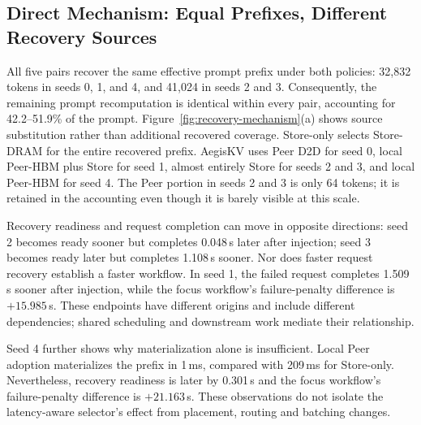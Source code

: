 \subsection{Direct Mechanism: Equal Prefixes, Different Recovery Sources}
\label{sec:direct-results}


All five pairs recover the same effective prompt prefix under both policies:
32,832 tokens in seeds 0, 1, and 4, and 41,024 in seeds 2 and 3.
Consequently, the remaining prompt recomputation is identical within every
pair, accounting for 42.2--51.9\% of the prompt.
Figure~\ref{fig:recovery-mechanism}(a) shows source substitution rather
than additional recovered coverage. Store-only selects Store-DRAM for the
entire recovered prefix. AegisKV uses Peer D2D for seed 0, local Peer-HBM
plus Store for seed 1, almost entirely Store for seeds 2 and 3, and local
Peer-HBM for seed 4. The Peer portion in seeds 2 and 3 is only 64 tokens;
it is retained in the accounting even though it is barely visible at this scale.

Recovery readiness and request completion can move in opposite directions:
seed 2 becomes ready sooner but completes 0.048\,s later after injection;
seed 3 becomes ready later but completes 1.108\,s sooner.
Nor does faster request recovery establish a faster workflow. In seed 1,
the failed request completes 1.509\,s sooner after injection, while the
focus workflow's failure-penalty difference is $+15.985$\,s.
These endpoints have different origins and include different dependencies;
shared scheduling and downstream work mediate their relationship.

Seed 4 further shows why materialization alone is insufficient. Local Peer
adoption materializes the prefix in 1\,ms, compared with 209\,ms for
Store-only. Nevertheless, recovery readiness is later by 0.301\,s and
the focus workflow's failure-penalty difference is $+21.163$\,s.
These observations do not isolate the latency-aware selector's effect from
placement, routing and batching changes.
